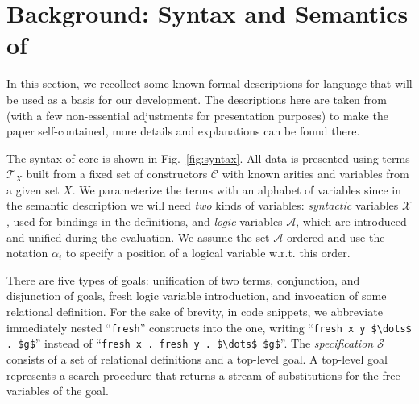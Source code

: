 \section{Background: Syntax and Semantics of \mK}
\label{sec:background}

In this section, we recollect some known formal descriptions for \mK language that will be used as a basis for our development.
The descriptions here are taken from~\cite{CertifiedSemantics} (with a few non-essential adjustments for presentation purposes) to make
the paper self-contained, more details and explanations can be found there.

The syntax of core \mK is shown in Fig.~\ref{fig:syntax}. 
All data is presented using terms $\mathcal{T}_X$ built from a fixed set of constructors $\mathcal{C}$ with known arities and variables
from a given set $X$.
We parameterize the terms with an alphabet of variables since in the semantic description we will need \emph{two} kinds of variables:
\emph{syntactic} variables $\mathcal{X}$, used for bindings in the definitions, and \emph{logic} variables $\mathcal{A}$, which are
introduced and unified during the evaluation. We assume the set $\mathcal{A}$ ordered and use the notation $\alpha_i$ 
to specify a position of a logical variable w.r.t. this order.

There are five types of goals: unification of two terms, conjunction, and disjunction of goals,
fresh logic variable introduction, and invocation of some relational definition. For the sake of brevity, in code snippets, we abbreviate
immediately nested ``\lstinline|fresh|'' constructs into the one, writing ``\lstinline|fresh x y $\dots$ . $g$|'' instead of
``\lstinline|fresh x . fresh y . $\dots$ $g$|''. The \emph{specification} $\mathcal{S}$ consists of a set of relational definitions and a top-level goal.
A top-level goal represents a search procedure that returns a stream of substitutions for the free variables of the goal.


